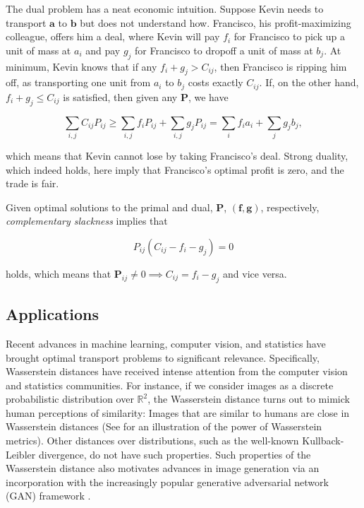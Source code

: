 \documentclass{article}
\renewcommand{\b}{\mathbf}
\theoremstyle{definition}
\theoremstyle{remark}
\begin{document}
The dual problem has a neat economic intuition. Suppose Kevin needs to transport
$\b a$ to $\b b$ but does not understand how. Francisco, his profit-maximizing
colleague, offers him a deal, where Kevin will pay $f_i$ for Francisco to pick
up a unit of mass at $a_i$ and pay $g_j$ for Francisco to dropoff a unit of mass
at $b_j.$ At minimum, Kevin knows that if any $f_i + g_j > C_ {ij}$, then
Francisco is ripping him off, as transporting one unit from $a_i$ to $b_j$ costs
exactly $C_{ij}$. If, on the other hand, $f_i + g_j \le C_{ij}$ is satisfied,
then given any $\b P$, we have

\[
\sum_{i,j} C_{ij}P_{ij} \ge \sum_{i,j} f_i P_{ij} + \sum_{i,j} g_j P_{ij} =
\sum_i f_i a_i + \sum_j g_j b_j \tag{Weak duality},
\]


which means that Kevin cannot lose by taking Francisco's deal. Strong duality,
which indeed holds, here imply that Francisco's optimal profit is zero, and the
trade is fair.


Given optimal solutions to the primal and dual, $\b P$, $(\b f, \b g)$,
respectively, \emph{complementary slackness} implies that

\[ P_{ij} (C_{ij} - f_i - g_j) = 0 \tag{Complementary slackness} \]

holds, which means that $\b P_{ij} \neq 0 \implies C_{ij} = f_i - g_j$ and
vice versa. 
\subsection{Applications} %
\label{sub:applications}

Recent advances in machine learning, computer vision, and statistics have
 brought optimal transport problems to significant relevance. Specifically,
 Wasserstein distances have received intense attention from the computer vision
 and statistics communities. For instance, if we consider images as a discrete
 probabilistic distribution over $\mathbb{R}^2$, the Wasserstein distance turns
 out to mimick human perceptions of similarity: Images that are similar to
 humans are close in Wasserstein distances (See \cite{solomon2015convolutional}
 for an illustration of the power of Wasserstein metrics). Other distances over
 distributions, such as the well-known Kullback-Leibler divergence, do not have
 such properties. Such properties of the Wasserstein distance also motivates
 advances in image generation via an incorporation with the increasingly popular
 generative adversarial network (GAN) framework \cite{arjovsky2017wasserstein}.
 
\end{document}
